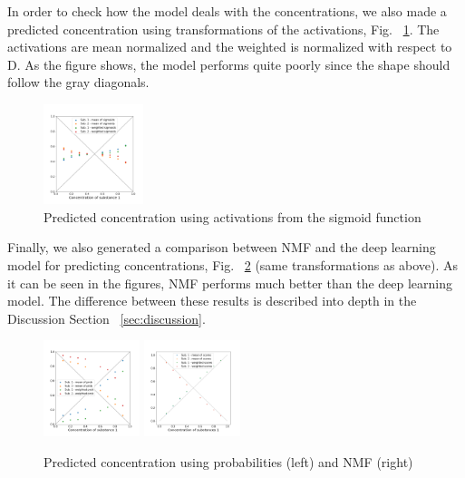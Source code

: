 \documentclass{article}
\begin{document}
%
In order to check how the model deals with the concentrations, we also made a predicted concentration using transformations of the activations, Fig. ~\ref{fig:conc_sigmoids}. The activations are mean normalized and the weighted is normalized with respect to D. 
As the figure shows, the model performs quite poorly since the shape should follow the gray diagonals. 
\begin{figure}[H]
	\centering
	\includegraphics[width=0.26\textwidth]{DNN_pred_conc_sigmoid_2.png} 
	\caption{Predicted concentration using activations from the sigmoid function}
	\label{fig:conc_sigmoids}
\end{figure}
%
Finally, we also generated a comparison between NMF and the deep learning model for predicting concentrations, Fig. ~\ref{fig:comparison} (same transformations as above). As it can be seen in the figures, NMF performs much better than the deep learning model. The difference between these results is described into depth in the Discussion Section ~\ref{sec:discussion}.
\begin{figure}[H]
	\includegraphics[width=0.25\textwidth]{DNN_pred_conc_prob_2.png} \hspace*{-.5cm}
	\includegraphics[width=0.25\textwidth]{nmf_pred_conc_2.png}
	\caption{Predicted concentration using probabilities (left) and NMF (right)}
	\label{fig:comparison}
\end{figure}
\end{document}
